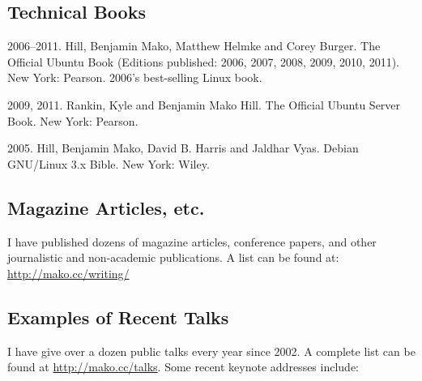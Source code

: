 \documentclass[11pt]{article}
\newenvironment{cvlist}{
\begin{list}{}{\leftmargin=3.0em \itemindent=-3.0em}
  \setlength{\itemsep}{0pt}
  \setlength{\parskip}{0em}
  \setlength{\parsep}{1em}
  \setlength{\parindent}{0em}}
{\vspace{1em}
\end{list}}
\begin{document}
\subsection{Technical Books}
\begin{cvlist}
\item 2006--2011. Hill, Benjamin Mako, Matthew Helmke and Corey
  Burger. The Official Ubuntu Book (Editions published: 2006, 2007,
  2008, 2009, 2010, 2011). New York: Pearson. 2006's best-selling Linux book.
\item 2009, 2011. Rankin, Kyle and Benjamin Mako Hill. The Official Ubuntu
  Server Book. New York: Pearson.
\item 2005. Hill, Benjamin Mako, David B. Harris and Jaldhar
  Vyas. Debian GNU/Linux 3.x Bible. New York: Wiley.
\end{cvlist}

\subsection{Magazine Articles, etc.}
I have published dozens of magazine articles, conference papers, and
other journalistic and non-academic publications. A list can be found
at: \url{http://mako.cc/writing/}

\vspace{2.5em}

\subsection{Examples of Recent Talks}
I have give over a dozen public talks every year since 2002. A
complete list can be found at \url{http://mako.cc/talks}. Some recent
keynote addresses include:
\end{document}
